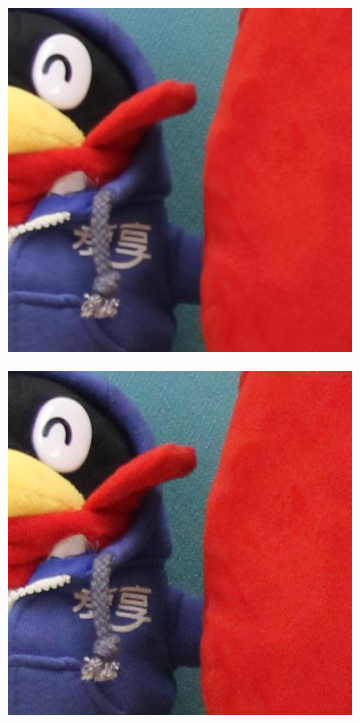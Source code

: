 \begin{figure}
\begin{subfigure}[t]{0.24\textwidth}
    \end{subfigure}
\hfill
    \begin{subfigure}[t]{0.24\textwidth}
        \centering
        \includegraphics[width=1\textwidth]{images/dataset/Canon600D_4-5_125_1600_toy_16_mean.JPG}
    \end{subfigure}
\hfill
    \begin{subfigure}[t]{0.24\textwidth}
        \centering
        \includegraphics[width=1\textwidth]{images/dataset/Canon600D_4-5_125_1600_toy_16_real.JPG}
    \end{subfigure}


\end{figure}
